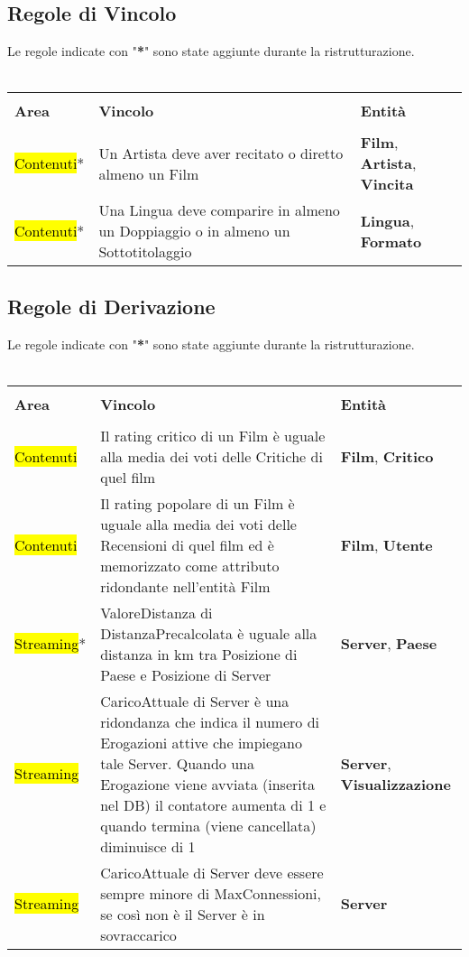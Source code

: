 \documentclass{article}
\begin{document}
\subsection{Regole di Vincolo}
Le regole indicate con "\textbf{*}" sono state aggiunte durante la ristrutturazione. \\ \\
\begin{tabular}{|C{1.8cm}|C{6.5cm}|C{2.6cm}|}
\hline
& & \\
    \textbf{Area} & \textbf{Vincolo} & \textbf{Entità} \\
& & \\
\hline
    \hl{Contenuti}* & Un Artista deve aver recitato o diretto almeno un Film & \textbf{Film}, \textbf{Artista}, \textbf{Vincita} \\
\hline
    \hl{Contenuti}* & Una Lingua deve comparire in almeno un Doppiaggio o in almeno un Sottotitolaggio & \textbf{Lingua}, \textbf{Formato} \\
\hline
\end{tabular}

\subsection{Regole di Derivazione}
Le regole indicate con "\textbf{*}" sono state aggiunte durante la ristrutturazione. \\ \\
\begin{tabular}{|C{1.8cm}|C{6.5cm}|C{2.6cm}|}
\hline
& & \\
    \textbf{Area} & \textbf{Vincolo} & \textbf{Entità} \\
& & \\
\hline
    \hl{Contenuti} & Il rating critico di un Film è uguale alla media dei voti delle Critiche di quel film & \textbf{Film}, \textbf{Critico} \\
\hline
    \hl{Contenuti} & Il rating popolare di un Film è uguale alla media dei voti delle Recensioni di quel film ed è memorizzato come attributo ridondante nell'entità Film & \textbf{Film}, \textbf{Utente} \\
\hline
    \hl{Streaming}* & ValoreDistanza di DistanzaPrecalcolata è uguale alla distanza in km tra Posizione di Paese e Posizione di Server & \textbf{Server}, \textbf{Paese} \\
\hline
    \hl{Streaming} & CaricoAttuale di Server è una ridondanza che indica il numero di Erogazioni attive che impiegano tale Server. Quando una Erogazione viene avviata (inserita nel DB) il contatore aumenta di 1 e quando termina (viene cancellata) diminuisce di 1 & \textbf{Server}, \textbf{Visualizzazione} \\
\hline
    \hl{Streaming} & CaricoAttuale di Server deve essere sempre minore di MaxConnessioni, se così non è il Server è in sovraccarico & \textbf{Server} \\
\hline
\end{tabular}
%
%
%
%
%
%
%
%
\end{document}
